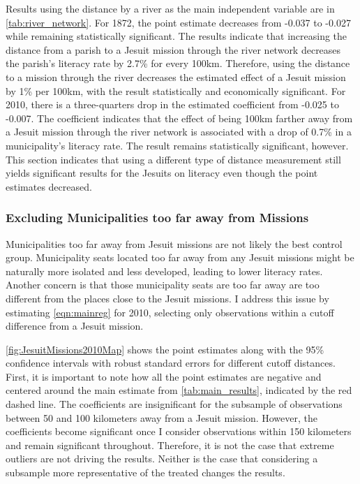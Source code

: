 \documentclass{article}
\begin{document}
Results using the distance by a river as the main independent variable are in \autoref{tab:river_network}. For 1872, the point estimate decreases from -0.037 to -0.027 while remaining statistically significant. The results indicate that increasing the distance from a parish to a Jesuit mission through the river network decreases the parish's literacy rate by 2.7\% for every 100km. Therefore, using the distance to a mission through the river decreases the estimated effect of a Jesuit mission by 1\% per 100km, with the result statistically and economically significant. For 2010, there is a three-quarters drop in the estimated coefficient from -0.025 to -0.007. The coefficient indicates that the effect of being 100km farther away from a Jesuit mission through the river network is associated with a drop of 0.7\% in a municipality's literacy rate. The result remains statistically significant, however. This section indicates that using a different type of distance measurement still yields significant results for the Jesuits on literacy even though the point estimates decreased.

\subsubsection{Excluding Municipalities too far away from Missions}

Municipalities too far away from Jesuit missions are not likely the best control group. Municipality seats located too far away from any Jesuit missions might be naturally more isolated and less developed, leading to lower literacy rates. Another concern is that those municipality seats are too far away are too different from the places close to the Jesuit missions. I address this issue by estimating \autoref{eqn:mainreg} for 2010, selecting only observations within a cutoff difference from a Jesuit mission.

\autoref{fig:JesuitMissions2010Map} shows the point estimates along with the 95\% confidence intervals with robust standard errors for different cutoff distances. First, it is important to note how all the point estimates are negative and centered around the main estimate from \autoref{tab:main_results}, indicated by the red dashed line. The coefficients are insignificant for the subsample of observations between 50 and 100 kilometers away from a Jesuit mission. However, the coefficients become significant once I consider observations within 150 kilometers and remain significant throughout. Therefore, it is not the case that extreme outliers are not driving the results. Neither is the case that considering a subsample more representative of the treated changes the results.
\end{document}
